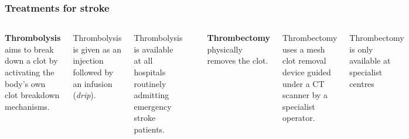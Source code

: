 \documentclass{beamer}
\begin{document}
\begin{frame}
\frametitle{Treatments for stroke}

\begin{columns}[t]
    \footnotesize{\textbf{Thrombolysis} aims to break down a clot by activating the body's own clot breakdown mechanisms.}
    
    \vspace{3mm}
    
    \footnotesize{Thrombolysis is given as an injection followed by an infusion (\emph{drip}).}
    
    \vspace{3mm}
    
    \footnotesize{Thrombolysis is available at all hospitals routinely admitting emergency stroke patients.} 
    
    \begin{center}
    \includegraphics[width=0.6\textwidth]{./images/thrombolysis_mechanism}
    \end{center}
    
    \footnotesize{\textbf{Thrombectomy} physically removes the clot.}
    
    \vspace{3mm}
    
    \footnotesize{Thrombectomy uses a mesh clot removal device guided under a CT scanner by a specialist operator.}
    
    \vspace{3mm}
    
    \footnotesize{Thrombectomy is only available at specialist centres} 
    
    \begin{center}
    \includegraphics[width=0.5\textwidth]{./images/thrombectomy_mesh}
    \end{center}


\end{columns}
\end{frame}
\end{document}
